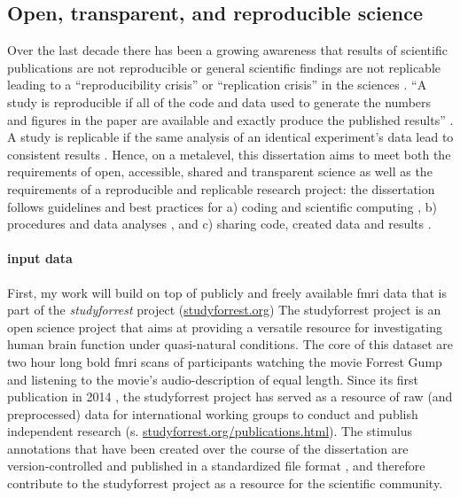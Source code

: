 \subsection{Open, transparent, and reproducible science}

Over the last decade there has been a growing awareness that results of
scientific publications are not reproducible or general scientific findings are
not replicable leading to a ``reproducibility crisis'' or ``replication crisis''
in the sciences \citep{baker2016reproducibility, plesser2018reproducibility,
stupple2019reproducibility, nosek2022replicability}.
``A study is reproducible if all of the code and data used to generate the
numbers and figures in the paper are available and exactly produce the published
results'' \citep{leek2017most}.
A study is replicable if the same analysis of an identical experiment's data
lead to consistent results \citep{dubois2016building, leek2017most}.
%
Hence, on a metalevel, this dissertation aims to meet both the requirements of
open, accessible, shared and transparent science \citep{watson2015will,
fecher2014open} as well as the requirements of a reproducible and replicable
research project:
%
the dissertation follows guidelines and best practices for a) coding and
scientific computing \citep{wilson2014best}, b) procedures and data analyses
\citep{nichols2017best, poldrack2017scanning, poldrack2019establishment}, and c)
sharing code, created data and results \citep{eglen2017toward, nichols2017best,
pernet2015improving}.



\paragraph{input data}

First, my work will build on top of publicly and freely available \ac{fmri} data that
is part of the \textit{studyforrest} project
(\href{www.studyforrest.org}{studyforrest.org})
%
The studyforrest project is an open science project that aims at providing a
versatile resource for investigating human brain function under quasi-natural
conditions.
%
The core of this dataset are two hour long \ac{bold} \ac{fmri} scans of
participants watching the movie Forrest Gump and listening to the movie's
audio-description of equal length.
%
Since its first publication in 2014 \citep{hanke2014audiomovie}, the
studyforrest project has served as a resource of raw (and preprocessed) data for
international working groups to conduct and publish independent research (s.
\href{www.studyforrest.org/publications.html}{studyforrest.org/publications.html}).
%
The stimulus annotations that have been created over the course of the
dissertation are version-controlled and published in a standardized file format
\citep{haeusler2021speechanno}, and therefore contribute to the studyforrest
project as a resource for the scientific community.



